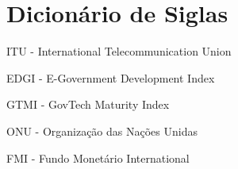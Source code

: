 \section*{Dicionário de Siglas}

ITU - International Telecommunication Union

EDGI - E-Government Development Index

GTMI - GovTech Maturity Index

ONU - Organização das Nações Unidas

FMI - Fundo Monetário International